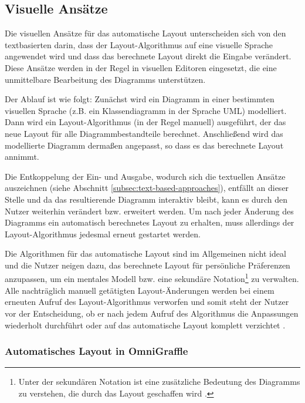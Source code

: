 \subsection{Visuelle Ansätze}
\label{subsec:visual-approaches}

Die visuellen Ansätze für das automatische Layout unterscheiden sich von den textbasierten darin, dass der Layout-Algorithmus auf eine visuelle Sprache angewendet wird und dass das berechnete Layout direkt die Eingabe verändert. Diese Ansätze werden in der Regel in visuellen Editoren eingesetzt, die eine unmittelbare Bearbeitung des Diagramms unterstützen.

Der Ablauf ist wie folgt: Zunächst wird ein Diagramm in einer bestimmten visuellen Sprache (z.B. ein Klassendiagramm in der Sprache UML) modelliert. Dann wird ein Layout-Algorithmus (in der Regel manuell) ausgeführt, der das neue Layout für alle Diagrammbestandteile berechnet. Anschließend wird das modellierte Diagramm dermaßen angepasst, so dass es das berechnete Layout annimmt.

Die Entkoppelung der Ein- und Ausgabe, wodurch sich die textuellen Ansätze auszeichnen (siehe Abschnitt \ref{subsec:text-based-approaches}), entfällt an dieser Stelle und da das resultierende Diagramm interaktiv bleibt, kann es durch den Nutzer weiterhin verändert bzw. erweitert werden. Um nach jeder Änderung des Diagramms ein automatisch berechnetes Layout zu erhalten, muss allerdings der Layout-Algorithmus jedesmal erneut gestartet werden.

Die Algorithmen für das automatische Layout sind im Allgemeinen nicht ideal und die Nutzer neigen dazu, das berechnete Layout für persönliche Präferenzen anzupassen, um ein mentales Modell bzw. eine sekundäre Notation\footnote{Unter der sekundären Notation ist eine zusätzliche Bedeutung des Diagramms zu verstehen, die durch das Layout geschaffen wird \cite{SeyboldGlinz03An-Effective}.} zu verwalten. Alle nachträglich manuell getätigten Layout-Änderungen werden bei einem erneuten Aufruf des Layout-Algorithmus verworfen und somit steht der Nutzer vor der Entscheidung, ob er nach jedem Aufruf des Algorithmus die Anpassungen wiederholt durchführt oder auf das automatische Layout komplett verzichtet \cite[S.119ff]{Eiglsperger04Automatic}.

\subsubsection{Automatisches Layout in OmniGraffle}
\label{subsubsec:omnigraffle-auto-layout}

